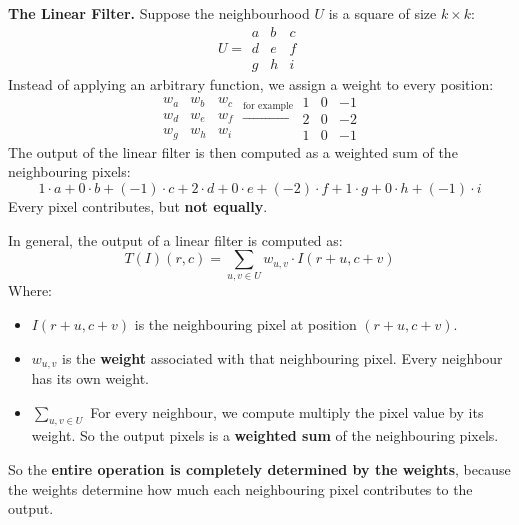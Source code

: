 \highspace
\textcolor{Green3}{ \textbf{The Linear Filter.}} Suppose the neighbourhood $U$ is a square of size $k \times k$:
\begin{equation*}
    U = \begin{matrix}
        a & b & c \\
        d & e & f \\
        g & h & i
    \end{matrix}
\end{equation*}
Instead of applying an arbitrary function, we assign a weight to every position:
\begin{equation*}
    \begin{matrix}
        w_{a} & w_{b} & w_{c} \\
        w_{d} & w_{e} & w_{f} \\
        w_{g} & w_{h} & w_{i}
    \end{matrix}
    \xrightarrow{\text{for example}}
    \begin{matrix}
        1 & 0 & -1 \\
        2 & 0 & -2 \\
        1 & 0 & -1
    \end{matrix}
\end{equation*}
The output of the linear filter is then computed as a weighted sum of the neighbouring pixels:
\begin{equation*}
    1 \cdot a + 0 \cdot b + (-1) \cdot c + 2 \cdot d + 0 \cdot e + (-2) \cdot f + 1 \cdot g + 0 \cdot h + (-1) \cdot i
\end{equation*}
Every pixel contributes, but \textbf{not equally}.

\highspace
In general, the output of a linear filter is computed as:
\begin{equation}\label{eq:linear-filter}
    T\left(I\right)\left(r,c\right) = \sum_{u,v \in U} w_{u,v} \cdot I\left(r+u, c+v\right)
\end{equation}
Where:
\begin{itemize}
    \item $I\left(r+u,c+v\right)$ is the neighbouring pixel at position $\left(r+u,c+v\right)$.
    \item $w_{u,v}$ is the \textbf{weight} associated with that neighbouring pixel. Every neighbour has its own weight.
    \item $\displaystyle\sum_{u,v \in U}$ For every neighbour, we compute multiply the pixel value by its weight. So the output pixels is a \textbf{weighted sum} of the neighbouring pixels.
\end{itemize}
So the \textbf{entire operation is completely determined by the weights}, because the weights determine how much each neighbouring pixel contributes to the output.

